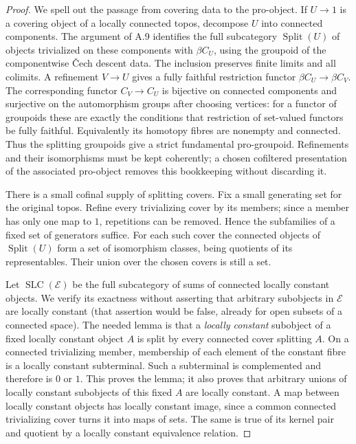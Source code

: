 \begin{proof}
We spell out the passage from covering data to the pro-object. If $U\to1$ is a covering object of a locally connected topos, decompose $U$ into connected components. The argument of A.9 identifies the full subcategory $\operatorname{Split}(U)$ of objects trivialized on these components with $\beta C_U$, using the groupoid of the componentwise \v Cech descent data. The inclusion preserves finite limits and all colimits. A refinement $V\to U$ gives a fully faithful restriction functor $\beta C_U\to\beta C_V$. The corresponding functor $C_V\to C_U$ is bijective on connected components and surjective on the automorphism groups after choosing vertices: for a functor of groupoids these are exactly the conditions that restriction of set-valued functors be fully faithful. Equivalently its homotopy fibres are nonempty and connected. Thus the splitting groupoids give a strict fundamental pro-groupoid. Refinements and their isomorphisms must be kept coherently; a chosen cofiltered presentation of the associated pro-object removes this bookkeeping without discarding it.

There is a small cofinal supply of splitting covers. Fix a small generating set for the original topos. Refine every trivializing cover by its members; since a member has only one map to $1$, repetitions can be removed. Hence the subfamilies of a fixed set of generators suffice. For each such cover the connected objects of $\operatorname{Split}(U)$ form a set of isomorphism classes, being quotients of its representables. Their union over the chosen covers is still a set.

Let $\operatorname{SLC}(\mathcal E)$ be the full subcategory of sums of connected locally constant objects. We verify its exactness without asserting that arbitrary subobjects in $\mathcal E$ are locally constant (that assertion would be false, already for open subsets of a connected space). The needed lemma is that a \emph{locally constant} subobject of a fixed locally constant object $A$ is split by every connected cover splitting $A$. On a connected trivializing member, membership of each element of the constant fibre is a locally constant subterminal. Such a subterminal is complemented and therefore is $0$ or $1$. This proves the lemma; it also proves that arbitrary unions of locally constant subobjects of this fixed $A$ are locally constant. A map between locally constant objects has locally constant image, since a common connected trivializing cover turns it into maps of sets. The same is true of its kernel pair and quotient by a locally constant equivalence relation.


\end{proof}
